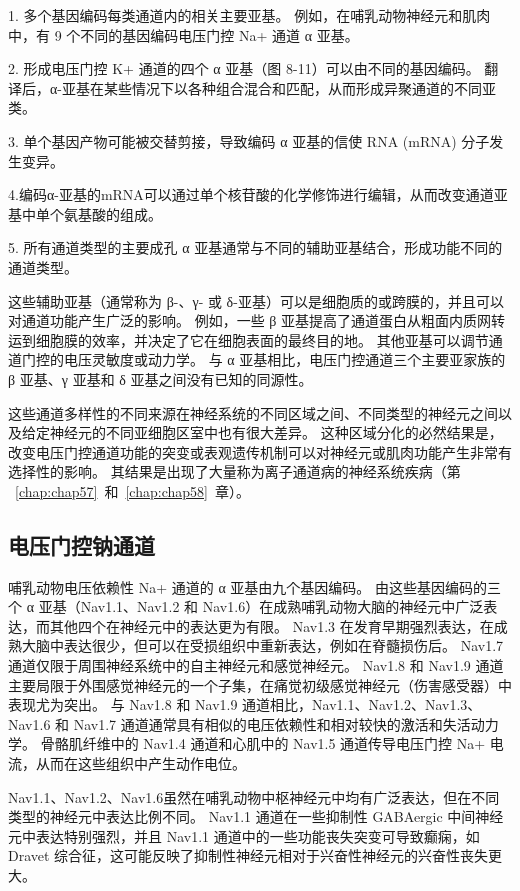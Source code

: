1. 多个基因编码每类通道内的相关主要亚基。
例如，在哺乳动物神经元和肌肉中，有 9 个不同的基因编码电压门控 Na+ 通道 α 亚基。


2. 形成电压门控 K+ 通道的四个 α 亚基（图 8-11）可以由不同的基因编码。
翻译后，α-亚基在某些情况下以各种组合混合和匹配，从而形成异聚通道的不同亚类。 


3. 单个基因产物可能被交替剪接，导致编码 α 亚基的信使 RNA (mRNA) 分子发生变异。


4.编码α-亚基的mRNA可以通过单个核苷酸的化学修饰进行编辑，从而改变通道亚基中单个氨基酸的组成。 


5. 所有通道类型的主要成孔 α 亚基通常与不同的辅助亚基结合，形成功能不同的通道类型。


这些辅助亚基（通常称为 β-、γ- 或 δ-亚基）可以是细胞质的或跨膜的，并且可以对通道功能产生广泛的影响。
例如，一些 β 亚基提高了通道蛋白从粗面内质网转运到细胞膜的效率，并决定了它在细胞表面的最终目的地。
其他亚基可以调节通道门控的电压灵敏度或动力学。
与 α 亚基相比，电压门控通道三个主要亚家族的 β 亚基、γ 亚基和 δ 亚基之间没有已知的同源性。


这些通道多样性的不同来源在神经系统的不同区域之间、不同类型的神经元之间以及给定神经元的不同亚细胞区室中也有很大差异。
这种区域分化的必然结果是，改变电压门控通道功能的突变或表观遗传机制可以对神经元或肌肉功能产生非常有选择性的影响。
其结果是出现了大量称为离子通道病的神经系统疾病（第 ~\ref{chap:chap57}~和~\ref{chap:chap58}~章）。



\subsection{电压门控钠通道}

哺乳动物电压依赖性 Na+ 通道的 α 亚基由九个基因编码。 由这些基因编码的三个 α 亚基（Nav1.1、Nav1.2 和 Nav1.6）在成熟哺乳动物大脑的神经元中广泛表达，而其他四个在神经元中的表达更为有限。 Nav1.3 在发育早期强烈表达，在成熟大脑中表达很少，但可以在受损组织中重新表达，例如在脊髓损伤后。 Nav1.7 通道仅限于周围神经系统中的自主神经元和感觉神经元。
Nav1.8 和 Nav1.9 通道主要局限于外围感觉神经元的一个子集，在痛觉初级感觉神经元（伤害感受器）中表现尤为突出。
与 Nav1.8 和 Nav1.9 通道相比，Nav1.1、Nav1.2、Nav1.3、Nav1.6 和 Nav1.7 通道通常具有相似的电压依赖性和相对较快的激活和失活动力学。 
骨骼肌纤维中的 Nav1.4 通道和心肌中的 Nav1.5 通道传导电压门控 Na+ 电流，从而在这些组织中产生动作电位。


Nav1.1、Nav1.2、Nav1.6虽然在哺乳动物中枢神经元中均有广泛表达，但在不同类型的神经元中表达比例不同。
Nav1.1 通道在一些抑制性 GABAergic 中间神经元中表达特别强烈，并且 Nav1.1 通道中的一些功能丧失突变可导致癫痫，如 Dravet 综合征，这可能反映了抑制性神经元相对于兴奋性神经元的兴奋性丧失更大。



